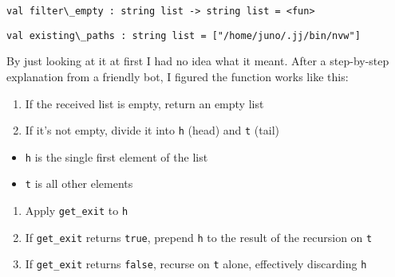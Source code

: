 \documentclass[11pt]{article}
\makeatletter
\providecommand{\tightlist}{%
      \setlength{\itemsep}{0pt}\setlength{\parskip}{0pt}}
\newcommand{\boxspacing}{\kern\kvtcb@left@rule\kern\kvtcb@boxsep}
\newcommand{\prompt}[4]{
        {\ttfamily\llap{{\color{#2}[#3]:\hspace{3pt}#4}}\vspace{-\baselineskip}}
    }
\makeatother
\begin{document}
            \begin{tcolorbox}[breakable, size=fbox, boxrule=.5pt, pad at break*=1mm, opacityfill=0]
\prompt{Out}{outcolor}{10}{\boxspacing}
\begin{Verbatim}[commandchars=\\\{\}]
val filter\_empty : string list -> string list = <fun>

\end{Verbatim}
\end{tcolorbox}
        
            \begin{tcolorbox}[breakable, size=fbox, boxrule=.5pt, pad at break*=1mm, opacityfill=0]
\prompt{Out}{outcolor}{10}{\boxspacing}
\begin{Verbatim}[commandchars=\\\{\}]
val existing\_paths : string list = ["/home/juno/.jj/bin/nvw"]

\end{Verbatim}
\end{tcolorbox}
        
    By just looking at it at first I had no idea what it meant. After a
step-by-step explanation from a friendly bot, I figured the function
works like this:

\begin{enumerate}
\def\labelenumi{\arabic{enumi}.}
\tightlist
\item
  If the received list is empty, return an empty list
\item
  If it's not empty, divide it into \texttt{h} (head) and \texttt{t}
  (tail)
\end{enumerate}

\begin{itemize}
\tightlist
\item
  \texttt{h} is the single first element of the list
\item
  \texttt{t} is all other elements
\end{itemize}

\begin{enumerate}
\def\labelenumi{\arabic{enumi}.}
\setcounter{enumi}{2}
\tightlist
\item
  Apply \texttt{get\_exit} to \texttt{h}
\item
  If \texttt{get\_exit} returns \texttt{true}, prepend \texttt{h} to the
  result of the recursion on \texttt{t}
\item
  If \texttt{get\_exit} returns \texttt{false}, recurse on \texttt{t}
  alone, effectively discarding \texttt{h}
\end{enumerate}
\end{document}
